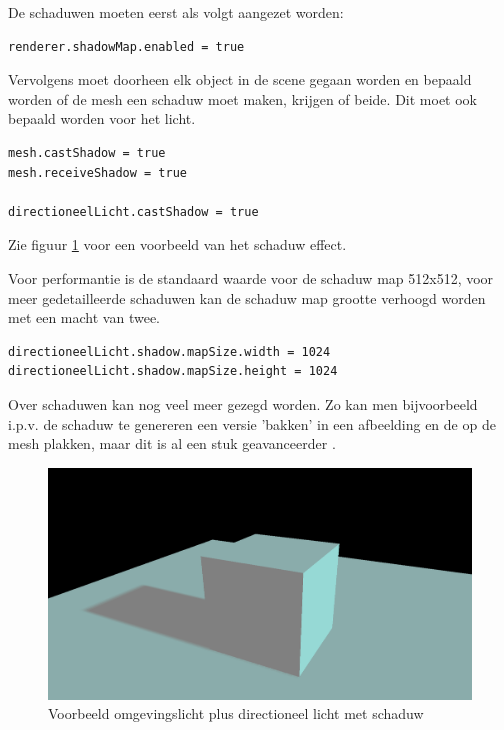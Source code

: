 De schaduwen moeten eerst als volgt aangezet worden:

\begin{lstlisting}
renderer.shadowMap.enabled = true
\end{lstlisting}

Vervolgens moet doorheen elk object in de scene gegaan worden en bepaald worden of de mesh een schaduw moet maken, krijgen of beide. Dit moet ook bepaald worden voor het licht.

\begin{lstlisting}
mesh.castShadow = true
mesh.receiveShadow = true

directioneelLicht.castShadow = true
\end{lstlisting}

Zie figuur \ref{fig:shadow} voor een voorbeeld van het schaduw effect.

Voor performantie is de standaard waarde voor de schaduw map 512x512, voor meer gedetailleerde schaduwen kan de schaduw map grootte verhoogd worden met een macht van twee.

\begin{lstlisting}
directioneelLicht.shadow.mapSize.width = 1024
directioneelLicht.shadow.mapSize.height = 1024
\end{lstlisting}

Over schaduwen kan nog veel meer gezegd worden. Zo kan men bijvoorbeeld i.p.v. de schaduw te genereren een versie 'bakken' in een afbeelding en de op de mesh plakken, maar dit is al een stuk geavanceerder \autocite{Simon2023}.

\begin{figure}
	\centering
	\includegraphics[width=1\linewidth]{graphics/shadow}
	\caption[Voorbeeld omgevingslicht plus directioneel licht met schaduw]{Voorbeeld omgevingslicht plus directioneel licht met schaduw}
	\label{fig:shadow}
\end{figure}

